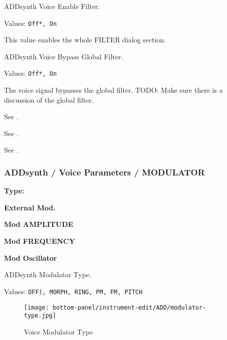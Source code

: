    \setcounter{ItemCounter}{0}      %

   ADDsynth Voice Enable Filter.

   Values: \texttt{Off*, On}

   This value enables the whole FILTER dialog section.

   ADDsynth Voice Bypass Global Filter.

   Values: \texttt{Off*, On}

   The voice signal bypasses the global filter.
   TODO:  Make sure there is a discussion of the global filter.

   See .

   See .

   See .

\subsubsection{ADDsynth / Voice Parameters / MODULATOR}
\label{subsubsec:addsynth_voice_parameters_modulator}

   \begin{enumber}
      \item \textbf{Type:}
      \item \textbf{External Mod.}
      \item \textbf{Mod AMPLITUDE}
      \item \textbf{Mod FREQUENCY}
      \item \textbf{Mod Oscillator}
   \end{enumber}

   \setcounter{ItemCounter}{0}      %

   ADDsynth Modulator Type.

   Values: \texttt{OFF(, MORPH, RING, PM, FM, PITCH}

\begin{figure}[H]
   \centering 
   \texttt{[image: bottom-panel/instrument-edit/ADD/modulator-type.jpg]}
   \caption{Voice Modulator Type}
   \label{fig:voice_modulator_type}
\end{figure}

